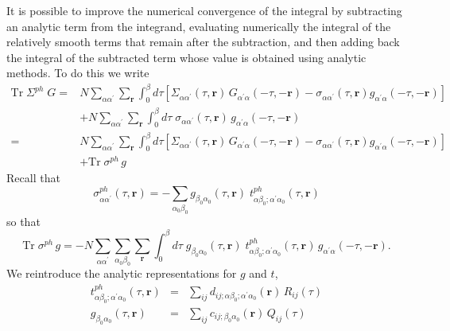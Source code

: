 It is possible to improve the numerical convergence of the integral
by subtracting an analytic term from the integrand, evaluating
numerically the integral of the relatively smooth terms that
remain after the subtraction, and then adding back the
integral of the subtracted term whose value is obtained
using analytic methods.  To do this we write
\begin{equation}
\begin{split}
\mathrm{Tr}\;\Sigma^{ph} \; G = & 
N \sum_{\alpha\alpha^{\prime}} 
\sum_{\mathbf{r}} \int_0^{\beta} d\tau 
\left[ \Sigma_{\alpha\alpha^{\prime}}(\tau,\mathbf{r})
\, G_{\alpha^{\prime}\alpha}(-\tau,-\mathbf{r})
-  \sigma_{\alpha\alpha^{\prime}}(\tau,\mathbf{r})
g_{\alpha^{\prime}\alpha}(-\tau,-\mathbf{r}) \right]  \\
& + N \sum_{\alpha\alpha^{\prime}} 
\sum_{\mathbf{r}} \int_0^{\beta} d\tau\;
 \sigma_{\alpha\alpha^{\prime}}(\tau,\mathbf{r})
\, g_{\alpha^{\prime}\alpha}(-\tau,-\mathbf{r}) \\
= &  
N \sum_{\alpha\alpha^{\prime}} 
\sum_{\mathbf{r}} \int_0^{\beta} d\tau 
\left[ \Sigma_{\alpha\alpha^{\prime}}(\tau,\mathbf{r})
\, G_{\alpha^{\prime}\alpha}(-\tau,-\mathbf{r})
-  \sigma_{\alpha\alpha^{\prime}}(\tau,\mathbf{r})
g_{\alpha^{\prime}\alpha}(-\tau,-\mathbf{r}) \right]  \\
& + \mathrm{Tr}\;\sigma^{ph}\,g
\end{split}
\end{equation}
Recall that
\begin{equation}
\sigma^{ph}_{\alpha\alpha^{\prime}}(\tau,\mathbf{r}) =
-\sum_{\alpha_0 \beta_0}
g_{\beta_0 \alpha_0}(\tau,\mathbf{r})\; 
t^{ph}_{\alpha \beta_0; \alpha^{\prime}\alpha_0}(\tau,\mathbf{r})
\end{equation}
so that
\begin{equation}
\mathrm{Tr}\;\sigma^{ph}\,g = -
N \sum_{\alpha\alpha^{\prime}} \sum_{\alpha_0\beta_0}
\sum_{\mathbf{r}} \int_0^{\beta} d\tau\;
g_{\beta_0 \alpha_0}(\tau,\mathbf{r})\; 
t^{ph}_{\alpha \beta_0; \alpha^{\prime}\alpha_0}(\tau,\mathbf{r})
\, g_{\alpha^{\prime}\alpha}(-\tau,-\mathbf{r}).
\end{equation}
We reintroduce the analytic representations for $g$ and $t$,
\begin{eqnarray}
t^{ph}_{\alpha \beta_0;\alpha^{\prime}\alpha_0}(\tau,\mathbf{r})
& = & \sum_{ij} 
d_{ij;\alpha \beta_0; \alpha^{\prime}\alpha_0}(\mathbf{r})\,
R_{ij}(\tau) \\
g_{\beta_0 \alpha_0}(\tau,\mathbf{r}) & = &
\sum_{ij} c_{ij; \beta_0 \alpha_0}(\mathbf{r})\, Q_{ij}(\tau) 
\end{eqnarray}
